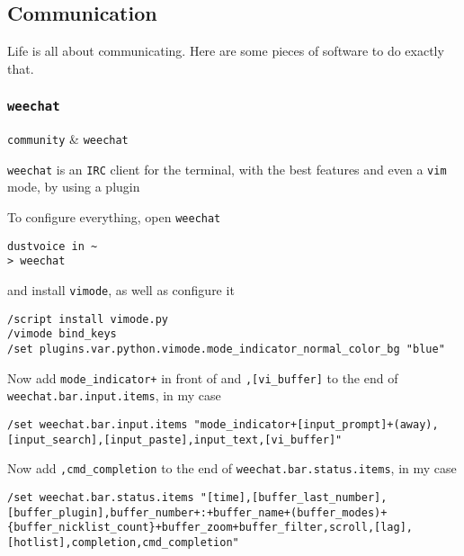 \documentclass[10pt]{dustdoc}
\begin{document}
\subsection{Communication}%
\label{sec:fish-communication}

Life is all about communicating.
Here are some pieces of software to do exactly that.

\subsubsection{\texttt{weechat}}%
\label{sec:weechat}

\begin{pkgtable}
    \texttt{community} & \texttt{weechat} \\
\end{pkgtable}

\texttt{weechat} is an \texttt{IRC} client for the terminal, with the best features and even a \texttt{vim} mode, by using a plugin

To configure everything, open \texttt{weechat}

\begin{verbatim}
dustvoice in ~
> weechat
\end{verbatim}


\noindent
and install \texttt{vimode}, as well as configure it

\begin{verbatim}
/script install vimode.py
/vimode bind_keys
/set plugins.var.python.vimode.mode_indicator_normal_color_bg "blue"
\end{verbatim}

Now add \texttt{mode_indicator+} in front of and \texttt{,[vi_buffer]} to the end of \texttt{weechat.bar.input.items}, in my case

\begin{verbatim}
/set weechat.bar.input.items "mode_indicator+[input_prompt]+(away),[input_search],[input_paste],input_text,[vi_buffer]"
\end{verbatim}

Now add \texttt{,cmd_completion} to the end of \texttt{weechat.bar.status.items}, in my case

\begin{verbatim}
/set weechat.bar.status.items "[time],[buffer_last_number],[buffer_plugin],buffer_number+:+buffer_name+(buffer_modes)+{buffer_nicklist_count}+buffer_zoom+buffer_filter,scroll,[lag],[hotlist],completion,cmd_completion"
\end{verbatim}
\end{document}
